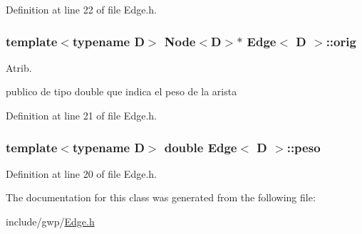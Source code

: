 Definition at line 22 of file Edge.\+h.

\hypertarget{class_edge_a070917707259b3ffc5ea6639ba381339}{
\subsubsection[{orig}]{\setlength{\rightskip}{0pt plus 5cm}template$<$typename D$>$ {\bf Node}$<${\bf D}$>$$\ast$ {\bf Edge}$<$ {\bf D} $>$\+::orig}}\label{class_edge_a070917707259b3ffc5ea6639ba381339}


Atrib. 

publico de tipo double que indica el peso de la arista 

Definition at line 21 of file Edge.\+h.

\hypertarget{class_edge_a4f9e5f3de1623a82f0c3fe0f3c4eae9e}{
\subsubsection[{peso}]{\setlength{\rightskip}{0pt plus 5cm}template$<$typename D$>$ double {\bf Edge}$<$ {\bf D} $>$\+::peso}}\label{class_edge_a4f9e5f3de1623a82f0c3fe0f3c4eae9e}


Definition at line 20 of file Edge.\+h.



The documentation for this class was generated from the following file\+:\begin{DoxyCompactItemize}
\item 
include/gwp/\hyperlink{_edge_8h}{Edge.\+h}\end{DoxyCompactItemize}
